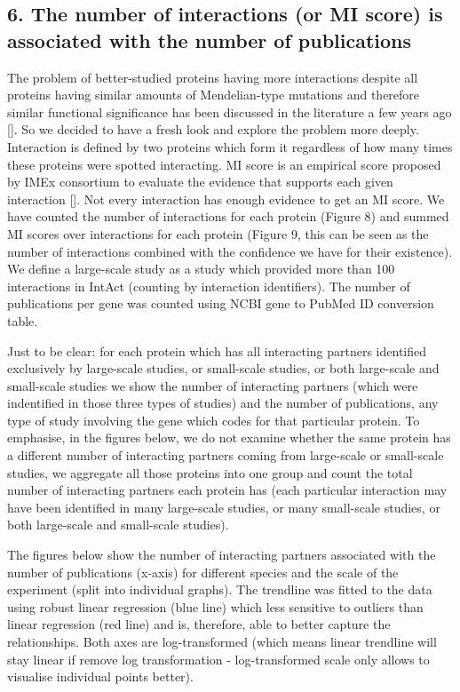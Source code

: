 \documentclass[]{article}
\begin{document}
\subsection{6. The number of interactions (or MI score) is associated
with the number of
publications}\label{the-number-of-interactions-or-mi-score-is-associated-with-the-number-of-publications}

The problem of better-studied proteins having more interactions despite
all proteins having similar amounts of Mendelian-type mutations and
therefore similar functional significance has been discussed in the
literature a few years ago {[}{]}. So we decided to have a fresh look
and explore the problem more deeply. Interaction is defined by two
proteins which form it regardless of how many times these proteins were
spotted interacting. MI score is an empirical score proposed by IMEx
consortium to evaluate the evidence that supports each given interaction
{[}{]}. Not every interaction has enough evidence to get an MI score. We
have counted the number of interactions for each protein (Figure 8) and
summed MI scores over interactions for each protein (Figure 9, this can
be seen as the number of interactions combined with the confidence we
have for their existence). We define a large-scale study as a study
which provided more than 100 interactions in IntAct (counting by
interaction identifiers). The number of publications per gene was
counted using NCBI gene to PubMed ID conversion table.

Just to be clear: for each protein which has all interacting partners
identified exclusively by large-scale studies, or small-scale studies,
or both large-scale and small-scale studies we show the number of
interacting partners (which were indentified in those three types of
studies) and the number of publications, any type of study involving the
gene which codes for that particular protein. To emphasise, in the
figures below, we do not examine whether the same protein has a
different number of interacting partners coming from large-scale or
small-scale studies, we aggregate all those proteins into one group and
count the total number of interacting partners each protein has (each
particular interaction may have been identified in many large-scale
studies, or many small-scale studies, or both large-scale and
small-scale studies).

The figures below show the number of interacting partners associated
with the number of publications (x-axis) for different species and the
scale of the experiment (split into individual graphs). The trendline
was fitted to the data using robust linear regression (blue line) which
less sensitive to outliers than linear regression (red line) and is,
therefore, able to better capture the relationships. Both axes are
log-transformed (which means linear trendline will stay linear if remove
log transformation - log-transformed scale only allows to visualise
individual points better).
\end{document}
